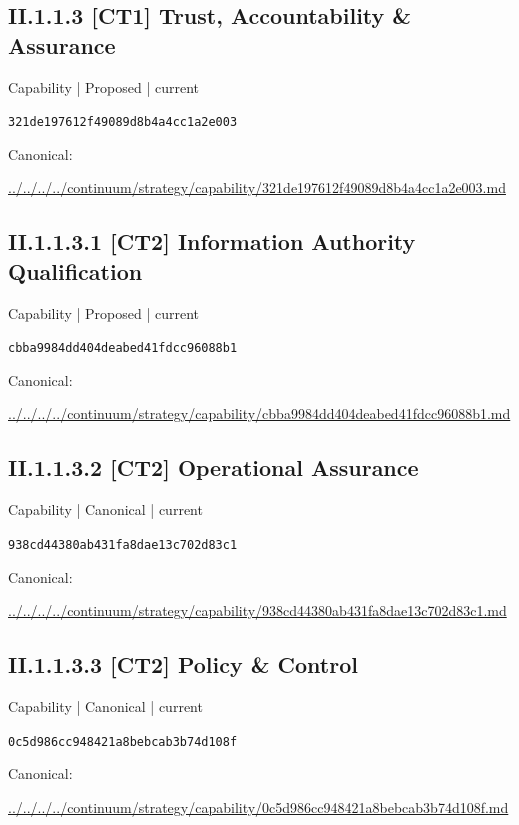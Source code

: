 \documentclass[10pt,a4paper]{article}
\begin{document}
\subsection*{II.1.1.3 [CT1] Trust, Accountability \& Assurance}
\label{element-321de197612f49089d8b4a4cc1a2e003}
{\small Capability | Proposed | current}\par
\texttt{321de197612f49089d8b4a4cc1a2e003}\par
Canonical: \par
{\footnotesize\url{../../../../continuum/strategy/capability/321de197612f49089d8b4a4cc1a2e003.md}}\par
\subsection*{II.1.1.3.1 [CT2] Information Authority Qualification}
\label{element-cbba9984dd404deabed41fdcc96088b1}
{\small Capability | Proposed | current}\par
\texttt{cbba9984dd404deabed41fdcc96088b1}\par
Canonical: \par
{\footnotesize\url{../../../../continuum/strategy/capability/cbba9984dd404deabed41fdcc96088b1.md}}\par
\subsection*{II.1.1.3.2 [CT2] Operational Assurance}
\label{element-938cd44380ab431fa8dae13c702d83c1}
{\small Capability | Canonical | current}\par
\texttt{938cd44380ab431fa8dae13c702d83c1}\par
Canonical: \par
{\footnotesize\url{../../../../continuum/strategy/capability/938cd44380ab431fa8dae13c702d83c1.md}}\par
\subsection*{II.1.1.3.3 [CT2] Policy \& Control}
\label{element-0c5d986cc948421a8bebcab3b74d108f}
{\small Capability | Canonical | current}\par
\texttt{0c5d986cc948421a8bebcab3b74d108f}\par
Canonical: \par
{\footnotesize\url{../../../../continuum/strategy/capability/0c5d986cc948421a8bebcab3b74d108f.md}}\par
\end{document}
